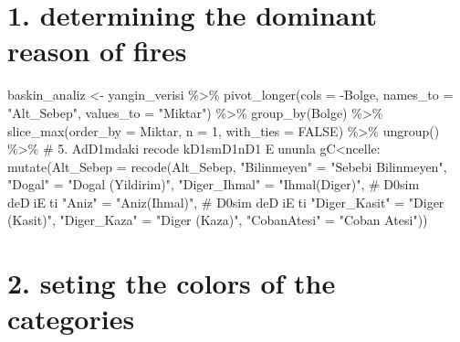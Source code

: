 \documentclass[
  11pt,
  a4paper,
  DIV=11,
  numbers=noendperiod]{scrartcl}
\newenvironment{Shaded}{\begin{snugshade}}{\end{snugshade}}
\newcommand{\AttributeTok}[1]{\textcolor[rgb]{0.40,0.45,0.13}{#1}}
\newcommand{\CommentTok}[1]{\textcolor[rgb]{0.37,0.37,0.37}{#1}}
\newcommand{\ConstantTok}[1]{\textcolor[rgb]{0.56,0.35,0.01}{#1}}
\newcommand{\DecValTok}[1]{\textcolor[rgb]{0.68,0.00,0.00}{#1}}
\newcommand{\FunctionTok}[1]{\textcolor[rgb]{0.28,0.35,0.67}{#1}}
\newcommand{\NormalTok}[1]{\textcolor[rgb]{0.00,0.23,0.31}{#1}}
\newcommand{\OtherTok}[1]{\textcolor[rgb]{0.00,0.23,0.31}{#1}}
\newcommand{\SpecialCharTok}[1]{\textcolor[rgb]{0.37,0.37,0.37}{#1}}
\newcommand{\StringTok}[1]{\textcolor[rgb]{0.13,0.47,0.30}{#1}}
\begin{document}
\section{1. determining the dominant reason of
fires}\label{determining-the-dominant-reason-of-fires}

\begin{Shaded}
\begin{Highlighting}[]
\NormalTok{baskin\_analiz }\OtherTok{\textless{}{-}}\NormalTok{ yangin\_verisi }\SpecialCharTok{\%\textgreater{}\%}
  \FunctionTok{pivot\_longer}\NormalTok{(}\AttributeTok{cols =} \SpecialCharTok{{-}}\NormalTok{Bolge, }\AttributeTok{names\_to =} \StringTok{"Alt\_Sebep"}\NormalTok{, }\AttributeTok{values\_to =} \StringTok{"Miktar"}\NormalTok{) }\SpecialCharTok{\%\textgreater{}\%}
  \FunctionTok{group\_by}\NormalTok{(Bolge) }\SpecialCharTok{\%\textgreater{}\%}
  \FunctionTok{slice\_max}\NormalTok{(}\AttributeTok{order\_by =}\NormalTok{ Miktar, }\AttributeTok{n =} \DecValTok{1}\NormalTok{, }\AttributeTok{with\_ties =} \ConstantTok{FALSE}\NormalTok{) }\SpecialCharTok{\%\textgreater{}\%}
  \FunctionTok{ungroup}\NormalTok{() }\SpecialCharTok{\%\textgreater{}\%}
  \CommentTok{\# 5. AdD1mdaki recode kD1smD1nD1 Eununla gC\textless{}ncelle:}
  \FunctionTok{mutate}\NormalTok{(}\AttributeTok{Alt\_Sebep =} \FunctionTok{recode}\NormalTok{(Alt\_Sebep, }
                            \StringTok{"Bilinmeyen"} \OtherTok{=} \StringTok{"Sebebi Bilinmeyen"}\NormalTok{,}
                            \StringTok{"Dogal"} \OtherTok{=} \StringTok{"Dogal (Yildirim)"}\NormalTok{,}
                            \StringTok{"Diger\_Ihmal"} \OtherTok{=} \StringTok{"Ihmal(Diger)"}\NormalTok{, }\CommentTok{\# D0sim deDiEti}
                            \StringTok{"Aniz"} \OtherTok{=} \StringTok{"Aniz(Ihmal)"}\NormalTok{,         }\CommentTok{\# D0sim deDiEti}
                            \StringTok{"Diger\_Kasit"} \OtherTok{=} \StringTok{"Diger (Kasit)"}\NormalTok{,}
                            \StringTok{"Diger\_Kaza"} \OtherTok{=} \StringTok{"Diger (Kaza)"}\NormalTok{,}
                            \StringTok{"CobanAtesi"} \OtherTok{=} \StringTok{"Coban Atesi"}\NormalTok{))}
\end{Highlighting}
\end{Shaded}

\section{2. seting the colors of the
categories}\label{seting-the-colors-of-the-categories}
\end{document}

